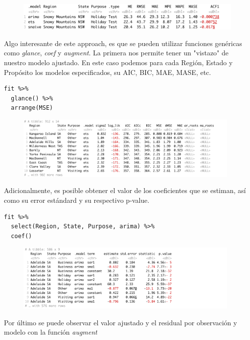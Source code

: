 \begin{figure}[!h]
        \includegraphics[width=120mm]{imgs/09_arima_error.png}
\end{figure}

\newpage

Algo interesante de este approach, es que se pueden utilizar funciones genéricas como \textit{glance}, \textit{coef} y \textit{augment}. La primera nos permite tener un "vistazo" de nuestro modelo ajustado. En este caso podemos para cada Región, Estado y Propósito los modelos especificados, su AIC, BIC, MAE, MASE, etc.

\begin{lstlisting}
fit %>%
  glance() %>% 
  arrange(MSE)
\end{lstlisting}

\begin{figure}[!h]
        \includegraphics[width=110mm]{imgs/10_glance.png}
\end{figure}

Adicionalmente, es posible obtener el valor de los coeficientes que se estiman, así como su error estándard y su respectivo p-value.

\begin{lstlisting}
fit %>%
  select(Region, State, Purpose, arima) %>%
  coef()
\end{lstlisting}

\begin{figure}[!h]
        \includegraphics[width=110mm]{imgs/11_coef.png}
\end{figure}

Por último se puede observar el valor ajustado y el residual por observación y modelo con la función \textit{augment}

